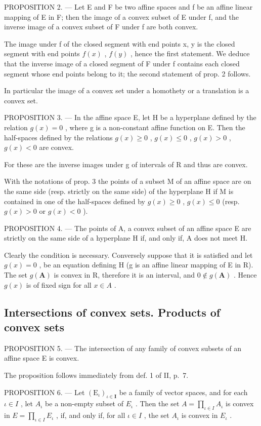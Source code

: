 PROPOSITION 2. --- Let E and F be two affine spaces and f be an affine linear mapping of E in F; then the image of a convex subset of E under f, and the inverse image of a convex subset of F under f are both convex.

The image under f of the closed segment with end points x, y is the closed segment with end points \(f(x)\) , \(f(y)\) , hence the first statement. We deduce that the inverse image of a closed segment of F under f contains each closed segment whose end points belong to it; the second statement of prop. 2 follows.

In particular the image of a convex set under a homothety or a translation is a convex set.

PROPOSITION 3. --- In the affine space E, let H be a hyperplane defined by the relation \(g(x) = 0\) , where g is a non-constant affine function on E. Then the half-spaces defined by the relations \(g(x) \geqslant 0\) , \(g(x) \leqslant 0\) , \(g(x) > 0\) , \(g(x) < 0\) are convex.

For these are the inverse images under g of intervals of R and thus are convex.

With the notations of prop. 3 the points of a subset M of an affine space are on the same side (resp. strictly on the same side) of the hyperplane H if M is contained in one of the half-spaces defined by \(g(x) \geqslant 0\) , \(g(x) \leqslant 0\) (resp. \(g(x) > 0\) or \(g(x) < 0\) ).

PROPOSITION 4. --- The points of A, a convex subset of an affine space E are strictly on the same side of a hyperplane H if, and only if, A does not meet H.

Clearly the condition is necessary. Conversely suppose that it is satisfied and let \(g(x) = 0\) , be an equation defining H (g is an affine linear mapping of E in R). The set \(g(\mathbf{A})\) is convex in R, therefore it is an interval, and \(0 \notin g(\mathbf{A})\) . Hence \(g(x)\) is of fixed sign for all \(x \in A\) .

\subsection{Intersections of convex sets. Products of convex sets}

PROPOSITION 5. --- The intersection of any family of convex subsets of an affine space E is convex.

The proposition follows immediately from def. 1 of II, p.~7.

PROPOSITION 6. --- Let \((\mathrm{E}_{\iota})_{\iota\in\mathbf{I}}\) be a family of vector spaces, and for each \(\iota\in I\) , let \(A_{\iota}\) be a non-empty subset of \(E_{\iota}\) . Then the set \(A=\prod_{\iota\in I}A_{\iota}\) is convex in \(E=\prod_{\iota\in I}E_{\iota}\) , if, and only if, for all \(\iota\in I\) , the set \(A_{\iota}\) is convex in \(E_{\iota}\) .

